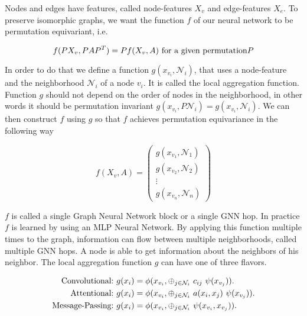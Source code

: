 Nodes and edges have features, called node-features $X_v$ and edge-features $X_e$. To preserve isomorphic graphs, we want the function $f$ of our neural network to be permutation equivariant, i.e. 

\begin{equation}
    f(PX_v,PAP^T) = Pf(X_v,A)\ \textup{for a given permutation} P \nonumber
\end{equation}

In order to do that we define a function $g(x_{v_i}, \mathcal{N}_i)$, that uses a node-feature and the neighborhood  $\mathcal{N}_i$ of a node $v_i$. It is called the local aggregation function. Function $g$ should not depend on the order of nodes in the neighborhood, in other words it should be permutation invariant $g(x_{v_i}, P\mathcal{N}_i) = g(x_{v_i}, \mathcal{N}_i)$. We can then construct $f$ using $g$ so that $f$ achieves permutation equivariance in the following way

\begin{equation}
    f(X_v,A) = \begin{pmatrix} g(x_{v_1},\mathcal{N}_1) \\ g(x_{v_2},\mathcal{N}_2) \\ \vdots \\ g(x_{v_n},\mathcal{N}_n) \end{pmatrix} \nonumber
\end{equation}

$f$ is called a single Graph Neural Network block or a single GNN hop. In practice $f$ is learned by using an MLP Neural Network. By applying this function multiple times to the graph, information can flow between multiple neighborhoods, called multiple GNN hops. A node is able to get information about the neighbors of his neighbor. The local aggregation function $g$ can have one of three flavors.

\begin{equation}
    \begin{aligned}
        \textup{Convolutional:}\ & g(x_i) = \phi(x_{v_i}, \oplus_{j \in \mathcal{N}_i}\ c_{ij}\ \psi(x_{v_j})).\\
        \textup{Attentional:}\ & g(x_i) = \phi(x_{v_i}, \oplus_{j \in \mathcal{N}_i}\ a(x_i,x_j)\ \psi(x_{v_j})).\\
        \textup{Message-Passing:}\ & g(x_i) = \phi(x_{v_i}, \oplus_{j \in \mathcal{N}_i}\ \psi(x_{v_i}, x_{v_j})). \\
    \end{aligned}
    \nonumber
\end{equation}

